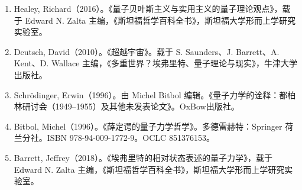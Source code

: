 \begin{enumerate}
\item Healey, Richard（2016）。《量子贝叶斯主义与实用主义的量子理论观点》，载于 Edward N. Zalta 主编，《斯坦福哲学百科全书》，斯坦福大学形而上学研究实验室。
\item Deutsch, David（2010）。《超越宇宙》。载于 S. Saunders、J. Barrett、A. Kent、D. Wallace 主编，《多重世界？埃弗里特、量子理论与现实》，牛津大学出版社。
\item Schrödinger, Erwin（1996）。由 Michel Bitbol 编辑。《量子力学的诠释：都柏林研讨会（1949–1955）及其他未发表论文》。OxBow出版社。
\item Bitbol, Michel（1996）。《薛定谔的量子力学哲学》。多德雷赫特：Springer 荷兰分社。ISBN 978-94-009-1772-9。OCLC 851376153。
\item Barrett, Jeffrey（2018）。《埃弗里特的相对状态表述的量子力学》，载于 Edward N. Zalta 主编，《斯坦福哲学百科全书》，斯坦福大学形而上学研究实验室。
\end{enumerate}